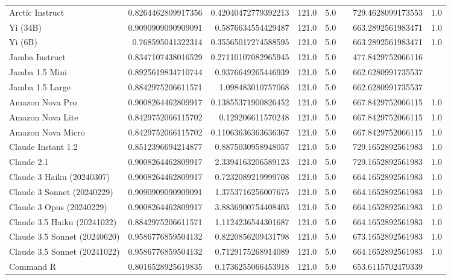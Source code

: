 \begin{table}[htp]
{\begin{tabular}{lrrrrrrr}
Arctic Instruct & 0.8264462809917356 & 0.42040472779392213 & 121.0 & 5.0 &  & 729.4628099173553 & 1.0 \\
Yi (34B) & 0.9090909090909091 & 0.5876634554429487 & 121.0 & 5.0 &  & 663.2892561983471 & 1.0 \\
Yi (6B) & 0.768595041322314 & 0.35565017274588595 & 121.0 & 5.0 &  & 663.2892561983471 & 1.0 \\
Jamba Instruct & 0.8347107438016529 & 0.27110107082965945 & 121.0 & 5.0 &  & 477.8429752066116 &  \\
Jamba 1.5 Mini & 0.8925619834710744 & 0.9376649265446939 & 121.0 & 5.0 &  & 662.6280991735537 &  \\
Jamba 1.5 Large & 0.8842975206611571 & 1.098483010757068 & 121.0 & 5.0 &  & 662.6280991735537 &  \\
Amazon Nova Pro & 0.9008264462809917 & 0.13855371900826452 & 121.0 & 5.0 &  & 667.8429752066115 & 1.0 \\
Amazon Nova Lite & 0.8429752066115702 & 0.129206611570248 & 121.0 & 5.0 &  & 667.8429752066115 & 1.0 \\
Amazon Nova Micro & 0.8429752066115702 & 0.11063636363636367 & 121.0 & 5.0 &  & 667.8429752066115 & 1.0 \\
Claude Instant 1.2 & 0.8512396694214877 & 0.8875030958948057 & 121.0 & 5.0 &  & 729.1652892561983 & 1.0 \\
Claude 2.1 & 0.9008264462809917 & 2.3394163206589123 & 121.0 & 5.0 &  & 729.1652892561983 & 1.0 \\
Claude 3 Haiku (20240307) & 0.9008264462809917 & 0.7232089219999708 & 121.0 & 5.0 &  & 664.1652892561983 & 1.0 \\
Claude 3 Sonnet (20240229) & 0.9090909090909091 & 1.3753716256007675 & 121.0 & 5.0 &  & 664.1652892561983 & 1.0 \\
Claude 3 Opus (20240229) & 0.9008264462809917 & 3.8836900754408403 & 121.0 & 5.0 &  & 664.1652892561983 & 1.0 \\
Claude 3.5 Haiku (20241022) & 0.8842975206611571 & 1.1124236544301687 & 121.0 & 5.0 &  & 664.1652892561983 & 1.0 \\
Claude 3.5 Sonnet (20240620) & 0.9586776859504132 & 0.8220856209431798 & 121.0 & 5.0 &  & 673.1652892561983 & 1.0 \\
Claude 3.5 Sonnet (20241022) & 0.9586776859504132 & 0.7129175268914089 & 121.0 & 5.0 &  & 664.1652892561983 & 1.0 \\
Command R & 0.8016528925619835 & 0.1736255066453918 & 121.0 & 5.0 &  & 653.6115702479339 &  \\

\end{tabular}}
\end{table}
